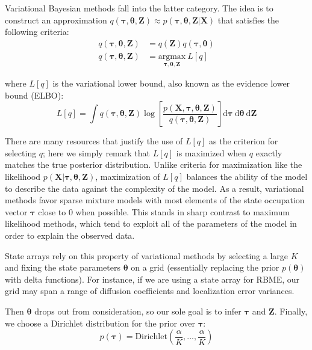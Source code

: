 \documentclass{article}
\renewcommand{\vec}{\mathbf}
\newcommand{\D}{\text{d}}
\begin{document}
Variational Bayesian methods fall into the latter category. The idea is to construct an 
approximation $q(\boldsymbol{\tau}, \boldsymbol{\theta}, \vec{Z}) \approx p \left( \boldsymbol{\tau}, \boldsymbol{\theta}, \vec{Z} | \vec{X} \right)$
that satisfies the following criteria:
\begin{align*}
	q(\boldsymbol{\tau}, \boldsymbol{\theta}, \vec{Z}) &= q(\vec{Z}) q(\boldsymbol{\tau}, \boldsymbol{\theta}) \\
	q(\boldsymbol{\tau}, \boldsymbol{\theta}, \vec{Z}) &= \underset{\boldsymbol{\tau}, \boldsymbol{\theta}, \vec{Z}}{\text{argmax}} \: L [q]
\end{align*}

where $L[q]$ is the variational lower bound, also known as the evidence lower bound (ELBO):
\[
	L[q] = \int q(\boldsymbol{\tau}, \boldsymbol{\theta}, \vec{Z}) \log \left[ 
		\frac{
			p(\vec{X}, \boldsymbol{\tau}, \boldsymbol{\theta}, \vec{Z})
		}{
			q(\boldsymbol{\tau}, \boldsymbol{\theta}, \vec{Z})
		}
	\right] \D \boldsymbol{\tau} \: \D \boldsymbol{\theta} \: \D \vec{Z}
\]

There are many resources that justify the use of $L[q]$ as the criterion for selecting
$q$; here we simply remark that $L[q]$ is maximized when $q$ exactly matches the true
posterior distribution. Unlike criteria for maximization like the likelihood 
$p (\vec{X} | \boldsymbol{\tau}, \boldsymbol{\theta}, \vec{Z})$, maximization of $L[q]$ 
balances the ability of the model to describe the data against the complexity of the 
model. As a result, variational methods favor sparse mixture models with most elements
of the state occupation vector $\boldsymbol{\tau}$ close to 0 when possible. This stands
in sharp contrast to maximum likelihood methods, which tend to exploit all of the parameters
of the model in order to explain the observed data. \newline

State arrays rely on this property of variational methods by selecting a large $K$ and 
fixing the state parameters $\boldsymbol{\theta}$ on a grid (essentially replacing the 
prior $p(\boldsymbol{\theta})$ with delta functions). For instance, if we are using a 
state array for RBME, our grid may span a range of diffusion coefficients and localization
error variances. \newline

Then $\boldsymbol{\theta}$ drops out from consideration, so our sole goal is to infer
$\boldsymbol{\tau}$ and $\vec{Z}$. Finally, we choose a Dirichlet distribution for 
the prior over $\boldsymbol{\tau}$:
\[
	p \left( \boldsymbol{\tau} \right) = \text{Dirichlet} \left( \frac{\alpha}{K}, ..., \frac{\alpha}{K} \right)
\]
\end{document}
